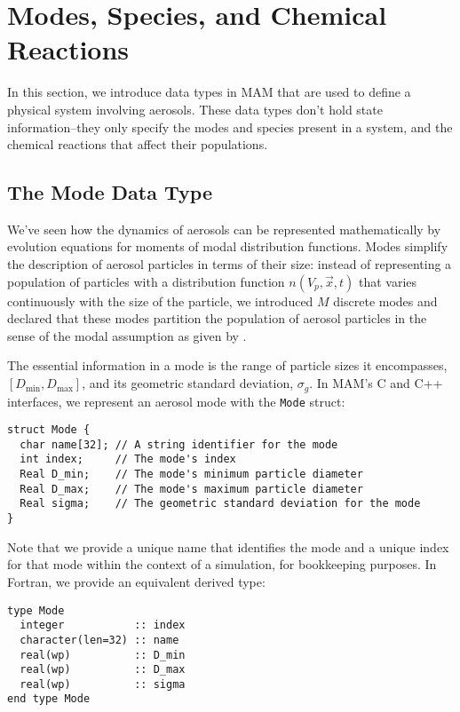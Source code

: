 \section{Modes, Species, and Chemical Reactions}

In this section, we introduce data types in MAM that are used to define a
physical system involving aerosols. These data types don't hold state
information--they only specify the modes and species present in a system,
and the chemical reactions that affect their populations.

\subsection{The Mode Data Type}

We've seen how the dynamics of aerosols can be represented mathematically
by evolution equations for moments of modal distribution functions. Modes
simplify the description of aerosol particles in terms of their size: instead of
representing a population of particles with a distribution function
$n(V_p, \vec{x}, t)$ that varies continuously with the size of the particle, we
introduced $M$ discrete modes and declared that these modes partition the
population of aerosol particles in the sense of the modal assumption as given
by .

The essential information in a mode is the range of particle sizes it
encompasses, $[D_{\min}, D_{\max}]$, and its geometric standard deviation,
$\sigma_g$. In MAM's C and C++ interfaces,
we represent an aerosol mode with the \verb|Mode| struct:

\begin{verbatim}
struct Mode {
  char name[32]; // A string identifier for the mode
  int index;     // The mode's index
  Real D_min;    // The mode's minimum particle diameter
  Real D_max;    // The mode's maximum particle diameter
  Real sigma;    // The geometric standard deviation for the mode
}
\end{verbatim}

Note that we provide a unique name that identifies the mode and a unique
index for that mode within the context of a simulation, for bookkeeping
purposes. In Fortran, we provide an equivalent derived type:

\begin{verbatim}
type Mode
  integer           :: index
  character(len=32) :: name
  real(wp)          :: D_min
  real(wp)          :: D_max
  real(wp)          :: sigma
end type Mode
\end{verbatim}


